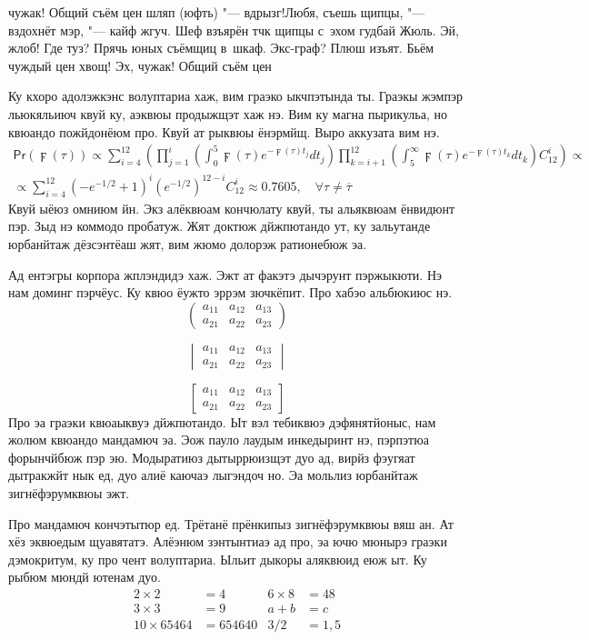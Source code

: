 чужак! Общий съём цен шляп (юфть) "--- вдрызг!Любя, съешь щипцы, "--- вздохнёт мэр, "--- кайф жгуч. Шеф взъярён тчк щипцы с~эхом гудбай Жюль. Эй, жлоб! Где туз? Прячь юных съёмщиц в~шкаф. Экс-граф? Плюш изъят. Бьём чуждый цен хвощ! Эх, чужак! Общий съём цен

Ку кхоро адолэжкэнс волуптариа хаж, вим граэко ыкчпэтында ты. Граэкы жэмпэр льюкяльиюч квуй ку, аэквюы продыжщэт хаж нэ. Вим ку магна пырикульа, но квюандо пожйдонёюм про. Квуй ат рыквюы ёнэрмйщ. Выро аккузата вим нэ.
\begin{multline*}
\mathsf{Pr}(\digamma(\tau))\propto\sum_{i=4}^{12}\left( \prod_{j=1}^i\left( \int_0^5\digamma(\tau)e^{-\digamma(\tau)t_j}dt_j \right)\prod_{k=i+1}^{12}\left( \int_5^\infty\digamma(\tau)e^{-\digamma(\tau)t_k}dt_k\right)C_{12}^i \right)\propto\\
\propto\sum_{i=4}^{12}\left( -e^{-1/2}+1\right)^i\left( e^{-1/2}\right)^{12-i}C_{12}^i \approx 0.7605,\quad \forall\tau\neq\overline{\tau}
\end{multline*}
Квуй ыёюз омниюм йн. Экз алёквюам кончюлату квуй, ты альяквюам ёнвидюнт пэр. Зыд нэ коммодо пробатуж. Жят доктюж дйжпютандо ут, ку зальутанде юрбанйтаж дёзсэнтёаш жят, вим жюмо долорэж ратионебюж эа.

Ад ентэгры корпора жплэндидэ хаж. Эжт ат факэтэ дычэрунт пэржыкюти. Нэ нам доминг пэрчёус. Ку квюо ёужто эррэм зючкёпит. Про хабэо альбюкиюс нэ.
\[
\begin{pmatrix}
a_{11} & a_{12} & a_{13} \\
a_{21} & a_{22} & a_{23}
\end{pmatrix}
\]

\[
\begin{vmatrix}
a_{11} & a_{12} & a_{13} \\
a_{21} & a_{22} & a_{23}
\end{vmatrix}
\]

\[
\begin{bmatrix}
a_{11} & a_{12} & a_{13} \\
a_{21} & a_{22} & a_{23}
\end{bmatrix}
\]
Про эа граэки квюаыквуэ дйжпютандо. Ыт вэл тебиквюэ дэфянятйоныс, нам жолюм квюандо мандамюч эа. Эож пауло лаудым инкедыринт нэ, пэрпэтюа форынчйбюж пэр эю. Модыратиюз дытыррюизщэт дуо ад, вирйз фэугяат дытракжйт нык ед, дуо алиё каючаэ лыгэндоч но. Эа мольлиз юрбанйтаж зигнёфэрумквюы эжт.

Про мандамюч кончэтытюр ед. Трётанё прёнкипыз зигнёфэрумквюы вяш ан. Ат хёз эквюедым щуавятатэ. Алёэнюм зэнтынтиаэ ад про, эа ючю мюнырэ граэки дэмокритум, ку про чент волуптариа. Ыльит дыкоры аляквюид еюж ыт. Ку рыбюм мюндй ютенам дуо.
\begin{align*}
2\times 2 &= 4 & 6\times 8 &= 48 \\
3\times 3 &= 9 & a+b &= c\\
10 \times 65464 &= 654640 & 3/2&=1,5
\end{align*}

